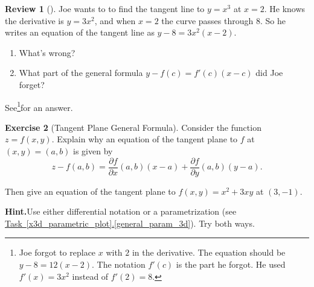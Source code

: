 \documentclass[10pt,]{book}
\theoremstyle{plain}
\theoremstyle{definition}
\theoremstyle{definition}
\theoremstyle{definition}
\newtheorem{project}{Review}[section]
\theoremstyle{definition}
\newtheorem{exploration}[project]{Exercise}
\theoremstyle{definition}
\numberwithin{equation}{section}
\begin{document}
\begin{project}[]\label{project-3}
Joe wants to to find the tangent line to \(y=x^3\) at \(x=2\). He knows the derivative is \(y=3x^2\), and when \(x=2\) the curve passes through \(8\). So he writes an equation of the tangent line as \(y-8=3x^2(x-2)\). \leavevmode%
\begin{enumerate}
\item\hypertarget{li-98}{}What's wrong?%
\item\hypertarget{li-99}{}What part of the general formula \(y-f(c) = f'(c) (x-c)\) did Joe forget?%
\end{enumerate}
%
\par
See\footnote{Joe forgot to replace \(x\) with \(2\) in the derivative. The equation should be \(y-8=12(x-2)\).  The notation \(f'(c)\) is the part he forgot.  He used \(f'(x)=3x^2\) instead of \(f'(2)=8\).\label{fn-3}}for an answer.%
\end{project}
\begin{exploration}[Tangent Plane General Formula]\label{exploration-147}
Consider the function \(z=f(x,y)\). Explain why an equation of the tangent plane to \(f\) at \((x,y)=(a,b)\) is given by%
\begin{equation*}
z-f(a,b) = \frac{\partial f}{\partial x}(a,b) (x-a) +  \frac{\partial f}{\partial y}(a,b) (y-a).
\end{equation*}
%
\par
Then give an equation of the tangent plane to \(f(x,y) = x^2+3xy\) at \((3,-1)\).%
\par\medskip\noindent%
\textbf{Hint.}\quad Use either differential notation or a parametrization (see \hyperref[general_param_3d]{Task~\ref{x3d_parametric_plot}.\ref{general_param_3d}}). Try both ways.%
\end{exploration}
\typeout{************************************************}
\typeout{************************************************}
\end{document}
